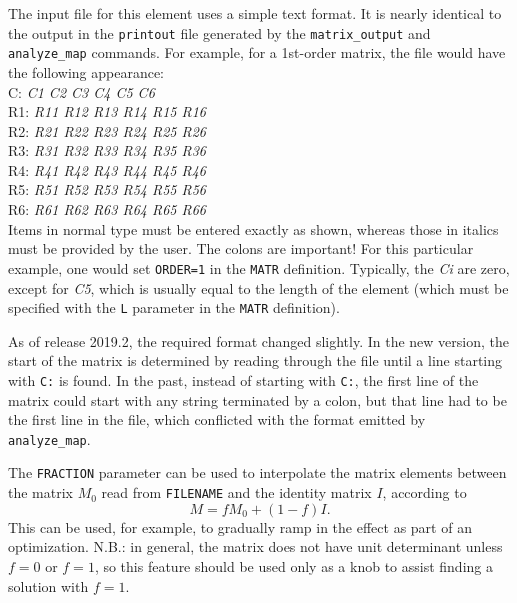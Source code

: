 The input file for this element uses a simple text format.  It is nearly identical
to the output in the {\tt printout} file generated by the {\tt matrix\_output}
and {\tt analyze\_map} commands.  For example, for a 1st-order matrix, the file would have the
following appearance:\\
C: {\em C1 C2 C3 C4 C5 C6}\\
R1: {\em R11 R12 R13 R14 R15 R16}\\
R2: {\em R21 R22 R23 R24 R25 R26}\\
R3: {\em R31 R32 R33 R34 R35 R36}\\
R4: {\em R41 R42 R43 R44 R45 R46}\\
R5: {\em R51 R52 R53 R54 R55 R56}\\
R6: {\em R61 R62 R63 R64 R65 R66}\\

Items in normal type must be entered exactly as shown, whereas those in
italics must be provided by the user.  The colons are important!
For this particular example, one would set {\tt ORDER=1} in the {\tt MATR}
definition.  Typically, the {\em Ci} are zero, except for {\em C5}, which
is usually equal to the length of the element (which must be specified with
the {\tt L} parameter in the {\tt MATR} definition).

As of release 2019.2, the required format changed slightly. 
In the new version, the start of the matrix is determined by reading through the file until 
a line starting with \verb|C:| is found.
In the past, 
instead of starting with \verb|C:|, the first line of the matrix could start
with any string terminated by a colon, but that line had to be the first line in the
file, which conflicted with the format emitted by \verb|analyze_map|.

The \verb|FRACTION| parameter can be used to interpolate the matrix elements between the
matrix $M_0$ read from \verb|FILENAME| and the identity matrix $I$, according to
\begin{equation}
M = fM_0 + (1-f)I.
\end{equation}
This can be used, for example, to gradually ramp in the effect as part of an optimization.
N.B.: in general, the matrix does not have unit determinant unless $f=0$ or $f=1$, so this 
feature should be used only as a knob to assist finding a solution with $f=1$.



